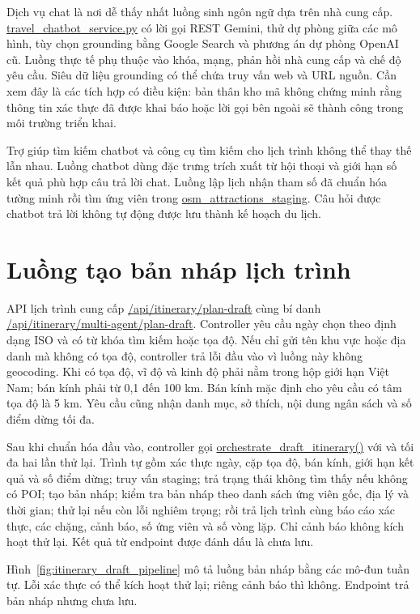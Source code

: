 Dịch vụ chat là nơi dễ thấy nhất luồng sinh ngôn ngữ dựa trên nhà cung cấp. \url{travel_chatbot_service.py} có lời gọi REST Gemini, thử dự phòng giữa các mô hình, tùy chọn grounding bằng Google Search và phương án dự phòng OpenAI cũ. Luồng thực tế phụ thuộc vào khóa, mạng, phản hồi nhà cung cấp và chế độ yêu cầu. Siêu dữ liệu grounding có thể chứa truy vấn web và URL nguồn. Cần xem đây là các tích hợp có điều kiện: bản thân kho mã không chứng minh rằng thông tin xác thực đã được khai báo hoặc lời gọi bên ngoài sẽ thành công trong môi trường triển khai.

Trợ giúp tìm kiếm chatbot và công cụ tìm kiếm cho lịch trình không thể thay thế lẫn nhau. Luồng chatbot dùng đặc trưng trích xuất từ hội thoại và giới hạn số kết quả phù hợp câu trả lời chat. Luồng lập lịch nhận tham số đã chuẩn hóa tường minh rồi tìm ứng viên trong \url{osm_attractions_staging}. Câu hỏi được chatbot trả lời không tự động được lưu thành kế hoạch du lịch.

\section{Luồng tạo bản nháp lịch trình}

API lịch trình cung cấp \url{/api/itinerary/plan-draft} cùng bí danh \url{/api/itinerary/multi-agent/plan-draft}. Controller yêu cầu ngày chọn theo định dạng ISO và có từ khóa tìm kiếm hoặc tọa độ. Nếu chỉ gửi tên khu vực hoặc địa danh mà không có tọa độ, controller trả lỗi đầu vào vì luồng này không geocoding. Khi có tọa độ, vĩ độ và kinh độ phải nằm trong hộp giới hạn Việt Nam; bán kính phải từ 0,1 đến 100 km. Bán kính mặc định cho yêu cầu có tâm tọa độ là 5 km. Yêu cầu cũng nhận danh mục, sở thích, nội dung ngân sách và số điểm dừng tối đa.

Sau khi chuẩn hóa đầu vào, controller gọi \url{orchestrate_draft_itinerary()} với  và tối đa hai lần thử lại. Trình tự gồm xác thực ngày, cặp tọa độ, bán kính, giới hạn kết quả và số điểm dừng; truy vấn staging; trả trạng thái không tìm thấy nếu không có POI; tạo bản nháp; kiểm tra bản nháp theo danh sách ứng viên gốc, địa lý và thời gian; thử lại nếu còn lỗi nghiêm trọng; rồi trả lịch trình cùng báo cáo xác thực, các chặng, cảnh báo, số ứng viên và số vòng lặp. Chỉ cảnh báo không kích hoạt thử lại. Kết quả từ endpoint được đánh dấu là chưa lưu.

Hình~\ref{fig:itinerary_draft_pipeline} mô tả luồng bản nháp bằng các mô-đun tuần tự. Lỗi xác thực có thể kích hoạt thử lại; riêng cảnh báo thì không. Endpoint trả bản nháp nhưng chưa lưu.

